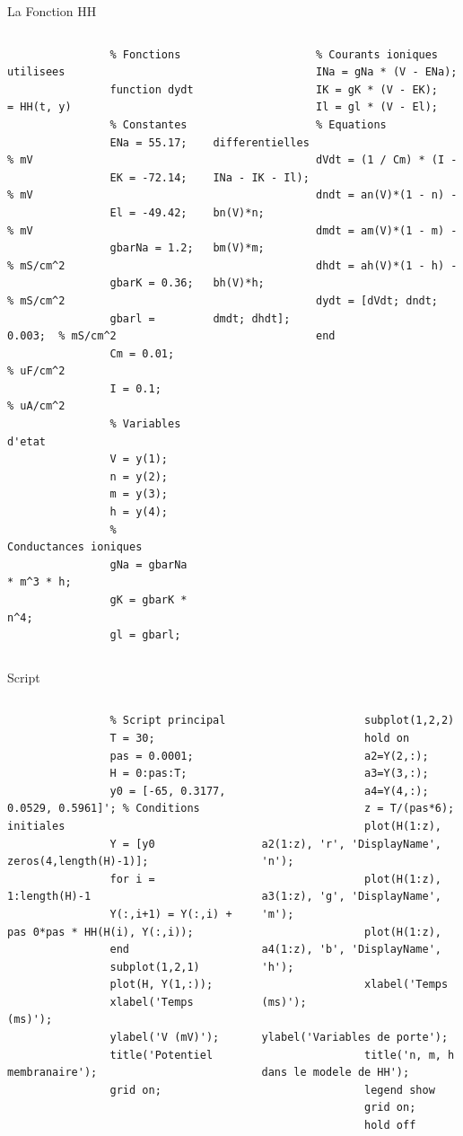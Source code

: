\documentclass[10pt,french]{beamer}
\begin{document}
	\begin{frame}[fragile]{La Fonction HH}
		\begin{columns}[T]
			\begin{lstlisting}
				% Fonctions utilisees
				function dydt = HH(t, y)
				% Constantes
				ENa = 55.17;    % mV
				EK = -72.14;    % mV
				El = -49.42;    % mV
				gbarNa = 1.2;   % mS/cm^2
				gbarK = 0.36;   % mS/cm^2
				gbarl = 0.003;  % mS/cm^2
				Cm = 0.01;      % uF/cm^2
				I = 0.1;        % uA/cm^2
				% Variables d'etat
				V = y(1);
				n = y(2);
				m = y(3);
				h = y(4);
				% Conductances ioniques
				gNa = gbarNa * m^3 * h;
				gK = gbarK * n^4;
				gl = gbarl;
			\end{lstlisting}
			\begin{lstlisting}
				% Courants ioniques
				INa = gNa * (V - ENa);
				IK = gK * (V - EK);
				Il = gl * (V - El);
				% Equations differentielles
				dVdt = (1 / Cm) * (I - INa - IK - Il);
				dndt = an(V)*(1 - n) - bn(V)*n;
				dmdt = am(V)*(1 - m) - bm(V)*m;
				dhdt = ah(V)*(1 - h) - bh(V)*h;
				dydt = [dVdt; dndt; dmdt; dhdt];
				end
			\end{lstlisting}
		\end{columns}
	\end{frame}
	
	\begin{frame}[fragile]{Script}
		\begin{columns}[T]
			\begin{lstlisting}
				% Script principal 
				T = 30;
				pas = 0.0001;
				H = 0:pas:T;
				y0 = [-65, 0.3177, 0.0529, 0.5961]'; % Conditions initiales
				Y = [y0 zeros(4,length(H)-1)];
				for i = 1:length(H)-1
				Y(:,i+1) = Y(:,i) + pas 0*pas * HH(H(i), Y(:,i));
				end
				subplot(1,2,1)
				plot(H, Y(1,:));
				xlabel('Temps (ms)');
				ylabel('V (mV)');
				title('Potentiel membranaire');
				grid on;
			\end{lstlisting}
			\begin{lstlisting}
				subplot(1,2,2)
				hold on
				a2=Y(2,:);
				a3=Y(3,:);
				a4=Y(4,:);
				z = T/(pas*6);
				plot(H(1:z), a2(1:z), 'r', 'DisplayName', 'n');
				plot(H(1:z), a3(1:z), 'g', 'DisplayName', 'm');
				plot(H(1:z), a4(1:z), 'b', 'DisplayName', 'h');
				xlabel('Temps (ms)');
				ylabel('Variables de porte');
				title('n, m, h dans le modele de HH');
				legend show
				grid on;
				hold off
			\end{lstlisting}
		\end{columns}
	\end{frame}
\end{document}
